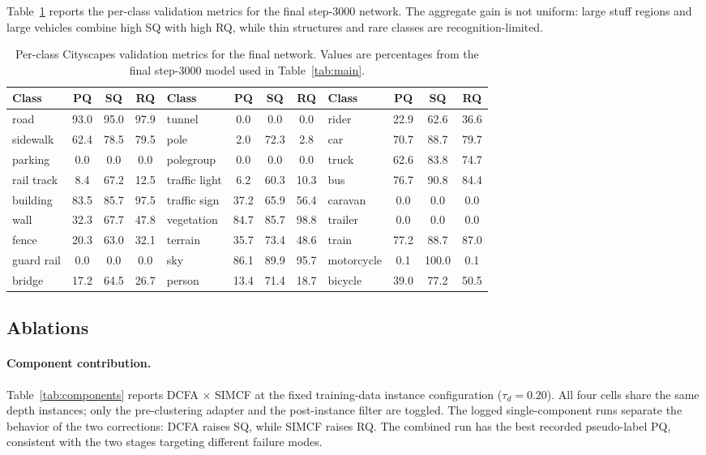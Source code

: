\documentclass[10pt,twocolumn,letterpaper]{article}
\begin{document}
Table~\ref{tab:perclass} reports the per-class validation metrics for the final step-3000 network. The aggregate gain is not uniform: large stuff regions and large vehicles combine high SQ with high RQ, while thin structures and rare classes are recognition-limited.

\begin{table}[t]
\centering
\scriptsize
\setlength{\tabcolsep}{2pt}
\begin{tabular}{l c c c l c c c l c c c}
\toprule
Class & PQ & SQ & RQ & Class & PQ & SQ & RQ & Class & PQ & SQ & RQ \\
\midrule
road & 93.0 & 95.0 & 97.9 & tunnel & 0.0 & 0.0 & 0.0 & rider & 22.9 & 62.6 & 36.6 \\
sidewalk & 62.4 & 78.5 & 79.5 & pole & 2.0 & 72.3 & 2.8 & car & 70.7 & 88.7 & 79.7 \\
parking & 0.0 & 0.0 & 0.0 & polegroup & 0.0 & 0.0 & 0.0 & truck & 62.6 & 83.8 & 74.7 \\
rail track & 8.4 & 67.2 & 12.5 & traffic light & 6.2 & 60.3 & 10.3 & bus & 76.7 & 90.8 & 84.4 \\
building & 83.5 & 85.7 & 97.5 & traffic sign & 37.2 & 65.9 & 56.4 & caravan & 0.0 & 0.0 & 0.0 \\
wall & 32.3 & 67.7 & 47.8 & vegetation & 84.7 & 85.7 & 98.8 & trailer & 0.0 & 0.0 & 0.0 \\
fence & 20.3 & 63.0 & 32.1 & terrain & 35.7 & 73.4 & 48.6 & train & 77.2 & 88.7 & 87.0 \\
guard rail & 0.0 & 0.0 & 0.0 & sky & 86.1 & 89.9 & 95.7 & motorcycle & 0.1 & 100.0 & 0.1 \\
bridge & 17.2 & 64.5 & 26.7 & person & 13.4 & 71.4 & 18.7 & bicycle & 39.0 & 77.2 & 50.5 \\
\bottomrule
\end{tabular}
\caption{Per-class Cityscapes validation metrics for the final network. Values are percentages from the final step-3000 model used in Table~\ref{tab:main}.}
\label{tab:perclass}
\end{table}


\subsection{Ablations}
\label{sec:exp:ablations}

\paragraph{Component contribution.}
Table~\ref{tab:components} reports DCFA $\times$ SIMCF at the fixed training-data instance configuration ($\tau_d = 0.20$). All four cells share the same depth instances; only the pre-clustering adapter and the post-instance filter are toggled. The logged single-component runs separate the behavior of the two corrections: DCFA raises SQ, while SIMCF raises RQ. The combined run has the best recorded pseudo-label PQ, consistent with the two stages targeting different failure modes.
\end{document}
